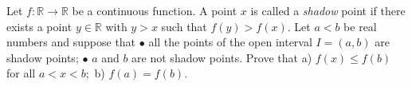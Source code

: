 Let $f:\mathbb{R} \to \mathbb{R}$ be a continuous function. A point $x$ is called a \textit{shadow} point if there exists a point $y\in \mathbb{R}$ with $y>x$ such that $f(y)>f(x).$ Let $a<b$ be real numbers and suppose that
$\bullet$ all the points of the open interval $I=(a,b)$ are shadow points;
$\bullet$ $a$ and $b$ are not shadow points.
Prove that
a) $f(x)\leq f(b)$ for all $a<x<b;$
b) $f(a)=f(b).$

